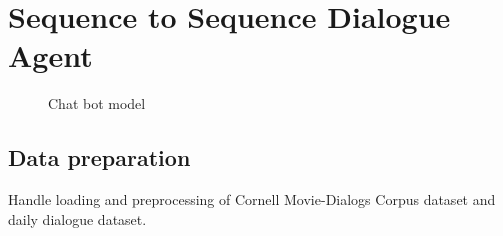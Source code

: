 \documentclass[11pt,a4paper]{article}
\begin{document}
\section{Sequence to Sequence Dialogue Agent}
\begin{figure}
\centering
{}
  \hfill
  \hfill
\caption{Chat bot model}
\end{figure}

\subsection{Data preparation}
Handle loading and preprocessing of Cornell Movie-Dialogs Corpus dataset and daily dialogue dataset.
\end{document}
